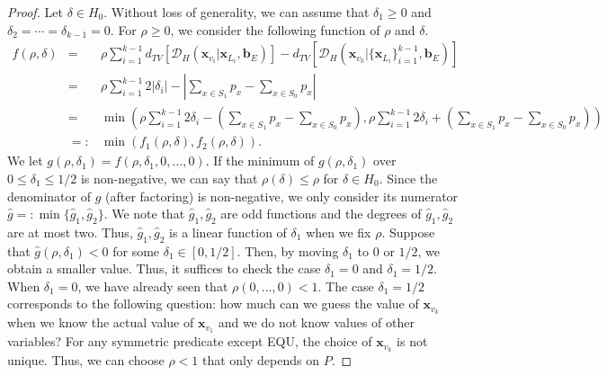 \documentclass[letterpaper,11pt]{article}
\newcommand{\dtv}{d_{TV}}
\newcommand{\cald}{\mathcal{D}}
\newcommand{\bfx}{\mathbf{x}}
\newcommand{\bfb}{\mathbf{b}}
\newcommand{\equ}{\textsf{EQU}\xspace}
\begin{document}
\begin{proof}
  Let $\delta\in H_0$.
  Without loss of generality,
  we can assume that $\delta_1\geq 0$ and $\delta_2=\cdots=\delta_{k-1}=0$.
  For $\rho \geq 0$, 
  we consider the following function of $\rho$ and $\delta$.
  \begin{eqnarray*}
    f(\rho,\delta)
    &=&
    \rho \sum_{i=1}^{k-1}\dtv[\cald_H(\bfx_{v_i}|\bfx_{L_i},\bfb_E)]  - \dtv[\cald_H(\bfx_{v_k}|\{\bfx_{L_i}\}_{i=1}^{k-1},\bfb_E)] \\
    &=&
    \rho \sum_{i=1}^{k-1}2|\delta_i|-\left| \sum_{x\in S_1}p_x-\sum_{x\in S_0}p_x \right|\\
    &=&
    \min\left(\rho \sum_{i=1}^{k-1}2\delta_i-\left(\sum_{x\in S_1}p_x-\sum_{x\in S_0}p_x\right),\rho\sum_{i=1}^{k-1}2\delta_i+\left(\sum_{x\in S_1}p_x-\sum_{x\in S_0}p_x\right)\right)\\
    &=:& 
    \min \left(f_1(\rho,\delta),f_2(\rho,\delta)\right).
  \end{eqnarray*}
  We let $g(\rho,\delta_1)=f(\rho,\delta_1,0,\ldots,0)$.
  If the minimum of $g(\rho,\delta_1)$ over $0\leq \delta_1 \leq 1/2$ is non-negative, 
  we can say that $\rho(\delta)\leq \rho$ for $\delta\in H_0$.
  Since the denominator of $g$ (after factoring) is non-negative,
  we only consider its numerator $\hat{g}=:\min\{\hat{g}_1,\hat{g}_2\}$.
  We note that $\hat{g}_1,\hat{g}_2$ are odd functions and the degrees of $\hat{g}_1,\hat{g}_2$ are at most two.
  Thus, $\hat{g}_1,\hat{g}_2$ is a linear function of $\delta_1$ when we fix $\rho$.
  Suppose that $\hat{g}(\rho,\delta_1)<0$ for some $\delta_1\in [0,1/2]$.
  Then, by moving $\delta_1$ to $0$ or $1/2$,
  we obtain a smaller value.
  Thus, it suffices to check the case $\delta_1=0$ and $\delta_1=1/2$.
  When $\delta_1=0$, we have already seen that $\rho(0,\ldots,0)<1$.
  The case $\delta_1=1/2$ corresponds to the following question:
  how much can we guess the value of $\bfx_{v_k}$ when we know the actual value of $\bfx_{v_1}$ and we do not know values of other variables?
  For any symmetric predicate except \equ, 
  the choice of $\bfx_{v_k}$ is not unique.
  Thus, we can choose $\rho<1$ that only depends on $P$.
\end{proof}
\end{document}
